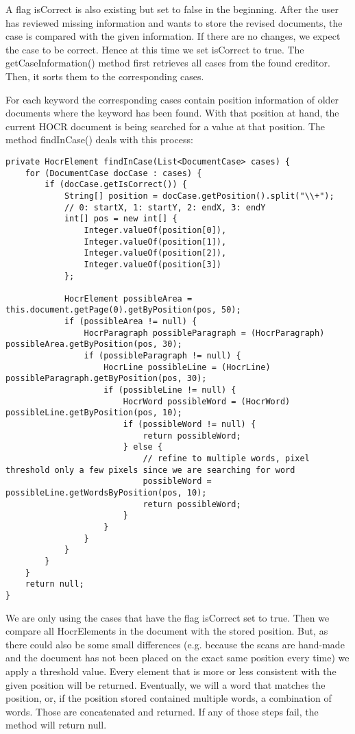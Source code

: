A flag isCorrect is also existing but set to false in the beginning. After the user has reviewed missing information and wants to store the revised documents, the case is compared with the given information. If there are no changes, we expect the case to be correct. Hence at this time we set isCorrect to true.
The getCaseInformation() method first retrieves all cases from the found creditor. Then, it sorts them to the corresponding cases.

For each keyword the corresponding cases contain position information of older documents where the keyword has been found. With that position at hand, the current HOCR document is being searched for a value at that position. The method findInCase() deals with this process:

\begin{lstlisting}
private HocrElement findInCase(List<DocumentCase> cases) {
    for (DocumentCase docCase : cases) {
        if (docCase.getIsCorrect()) {
            String[] position = docCase.getPosition().split("\\+");
            // 0: startX, 1: startY, 2: endX, 3: endY
            int[] pos = new int[] {
				Integer.valueOf(position[0]), 
				Integer.valueOf(position[1]), 
				Integer.valueOf(position[2]), 
				Integer.valueOf(position[3])
			};

            HocrElement possibleArea = this.document.getPage(0).getByPosition(pos, 50);
            if (possibleArea != null) {
                HocrParagraph possibleParagraph = (HocrParagraph)  possibleArea.getByPosition(pos, 30);
                if (possibleParagraph != null) {
                    HocrLine possibleLine = (HocrLine) possibleParagraph.getByPosition(pos, 30);
                    if (possibleLine != null) {
                        HocrWord possibleWord = (HocrWord) possibleLine.getByPosition(pos, 10);
                        if (possibleWord != null) {
                            return possibleWord;
                        } else {
                            // refine to multiple words, pixel threshold only a few pixels since we are searching for word
                            possibleWord = possibleLine.getWordsByPosition(pos, 10);
                            return possibleWord;
                        }
                    }
                }
            }
        }
    }
    return null;
}
\end{lstlisting}

We are only using the cases that have the flag isCorrect set to true. Then we compare all HocrElements in the document with the stored position. But, as there could also be some small differences (e.g. because the scans are hand-made and the document has not been placed on the exact same position every time) we apply a threshold value. Every element that is more or less consistent with the given position will be returned. Eventually, we will a word that matches the position, or, if the position stored contained multiple words, a combination of words. Those are concatenated and returned. If any of those steps fail, the method will return null.

